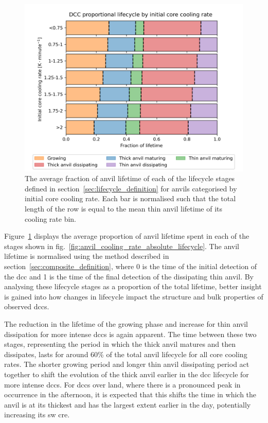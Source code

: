\begin{figure}[tp]
    \centering
    \includegraphics[width=\textwidth]{figures/chapter3_10.png}
    \caption[
    The average fraction of anvil lifetime of each lifecycle stage for anvils categorised by initial core cooling rate
    ]{
    The average fraction of anvil lifetime of each of the lifecycle stages defined in section~\ref{sec:lifecycle_definition} for anvils categorised by initial core cooling rate. Each bar is normalised such that the total length of the row is equal to the mean thin anvil lifetime of its cooling rate bin.
    }
    \label{fig:anvil_cooling_rate_proportional_lifecycle}
\end{figure}

Figure~\ref{fig:anvil_cooling_rate_proportional_lifecycle} displays the average proportion of anvil lifetime spent in each of the stages shown in fig.~\ref{fig:anvil_cooling_rate_absolute_lifecycle}.
The anvil lifetime is normalised using the method described in section~\ref{sec:composite_definition}, where 0 is the time of the initial detection of the \acrshort{dcc} and 1 is the time of the final detection of the dissipating thin anvil.
By analysing these lifecycle stages as a proportion of the total lifetime, better insight is gained into how changes in lifecycle impact the structure and bulk properties of observed \acrshort{dcc}s.

The reduction in the lifetime of the growing phase and increase for thin anvil dissipation for more intense \acrshort{dcc}s is again apparent.
The time between these two stages, representing the period in which the thick anvil matures and then dissipates, lasts for around 60\% of the total anvil lifecycle for all core cooling rates.
The shorter growing period and longer thin anvil dissipating period act together to shift the evolution of the thick anvil earlier in the \acrshort{dcc} lifecycle for more intense \acrshort{dcc}s.
For \acrshort{dcc}s over land, where there is a pronounced peak in occurrence in the afternoon, it is expected that this shifts the time in which the anvil is at its thickest and has the largest extent earlier in the day, potentially increasing its \acrshort{sw} \acrshort{cre}.


